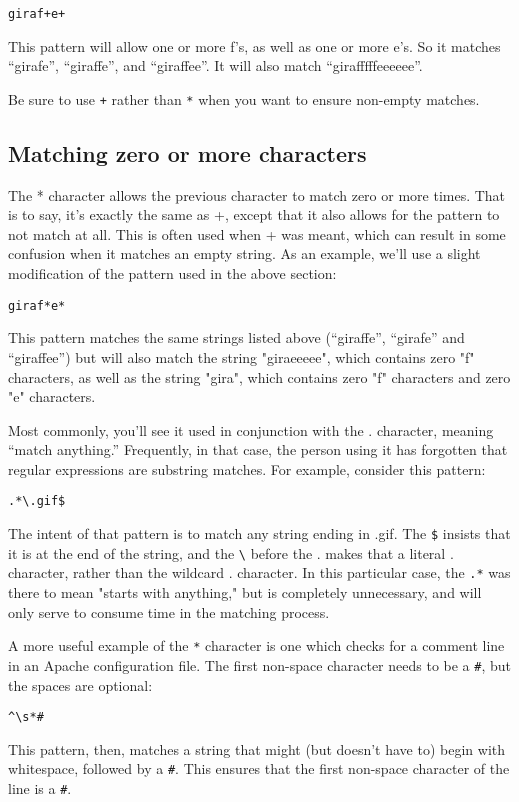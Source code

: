 \verb=giraf+e+=

This pattern will allow one or more f's, as well as one or more e's. So it matches 
``girafe'', ``giraffe'', and ``giraffee''. It will also match ``girafffffeeeeee''.

Be sure to use \verb=+= rather than \verb=*= when you want to ensure
non-empty matches.

\subsection{Matching zero or more characters}
\index{*}

The * character allows the previous character to match zero or more times. That is to say, it's
exactly the same as +, except that it also allows for the pattern to not match at all. This is
often used when + was meant, which can result in some confusion when it matches an empty
string. As an example, we'll use a slight modification of the pattern used in the above
section:

\verb=giraf*e*=

This pattern matches the same strings listed above (``giraffe'', ``girafe'' and ``giraffee'')
but will also match the string "giraeeeee", which contains zero "f" characters, as well as the
string "gira", which contains zero "f" characters and zero "e" characters.

Most commonly, you'll see it used in conjunction with the . character, meaning ``match
anything.'' Frequently, in that case, the person using it has forgotten that regular expressions
are substring matches. For example, consider this pattern:

\verb=.*\.gif$=

The intent of that pattern is to match any string ending in .gif. The \verb=$= insists that it is at the 
end of the string, and the \verb=\= before the . makes that a literal . character, rather than the wildcard 
. character. In this particular case, the \verb=.*= was there to mean "starts with anything," but is 
completely unnecessary, and will only serve to consume time in the matching process.

A more useful example of the \verb=*= character is one which checks for a comment line in an 
Apache configuration file. The first non-space character needs to be a \verb=#=, but the spaces are 
optional:

\verb=^\s*#=

This pattern, then, matches a string that might (but doesn't have to) begin with 
whitespace, followed by a \verb=#=. This ensures that the first non-space character of the line is a \verb=#=.

